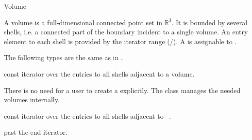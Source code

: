 
\ccRefPageBegin



\begin{ccRefClass}{Volume}

\ccDefinition

A volume is a full-dimensional connected point set in $\mathbb{R}^3$. It is
bounded by several shells, i.e. a connected part of the boundary incident
to a single volume. An entry element to each shell is provided by the 
iterator range (/). A 
 is assignable to .


\ccTypes
{}
\ccThreeToTwo

The following types are the same as in .



\ccGlue
{}
{const iterator over the entries to all shells adjacent to a volume.}

\ccCreation
{}

There is no need for a user to create a  explicitly. The
class  manages the needed volumes internally.


\ccOperations



{const iterator over the entries to all shells adjacent to \ccVar\ .}

{past-the-end iterator.}

\ccSeeAlso


\ccTagDefaults
\end{ccRefClass}

\ccRefPageEnd
